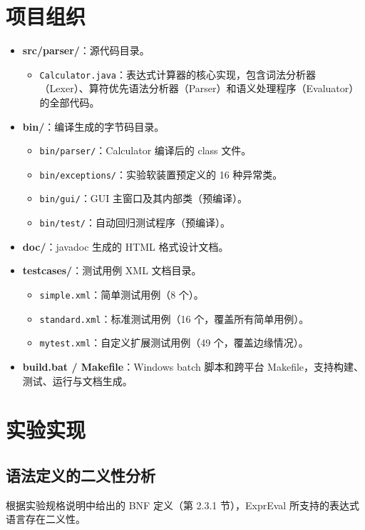 \chapter{项目组织}
\begin{itemize}
  \item \textbf{src/parser/}：源代码目录。
    \begin{itemize}
    \item \texttt{Calculator.java}：表达式计算器的核心实现，包含词法分析器（Lexer）、算符优先语法分析器（Parser）和语义处理程序（Evaluator）的全部代码。
    \end{itemize}
  \item \textbf{bin/}：编译生成的字节码目录。
    \begin{itemize}
    \item \texttt{bin/parser/}：Calculator 编译后的 class 文件。
    \item \texttt{bin/exceptions/}：实验软装置预定义的 16 种异常类。
    \item \texttt{bin/gui/}：GUI 主窗口及其内部类（预编译）。
    \item \texttt{bin/test/}：自动回归测试程序（预编译）。
    \end{itemize}
  \item \textbf{doc/}：javadoc 生成的 HTML 格式设计文档。
  \item \textbf{testcases/}：测试用例 XML 文档目录。
    \begin{itemize}
    \item \texttt{simple.xml}：简单测试用例（8 个）。
    \item \texttt{standard.xml}：标准测试用例（16 个，覆盖所有简单用例）。
    \item \texttt{mytest.xml}：自定义扩展测试用例（49 个，覆盖边缘情况）。
    \end{itemize}
  \item \textbf{build.bat / Makefile}：Windows batch 脚本和跨平台 Makefile，支持构建、测试、运行与文档生成。
\end{itemize}


\chapter{实验实现}

\section{语法定义的二义性分析}

根据实验规格说明中给出的 BNF 定义（第 2.3.1 节），ExprEval 所支持的表达式语言存在二义性。

